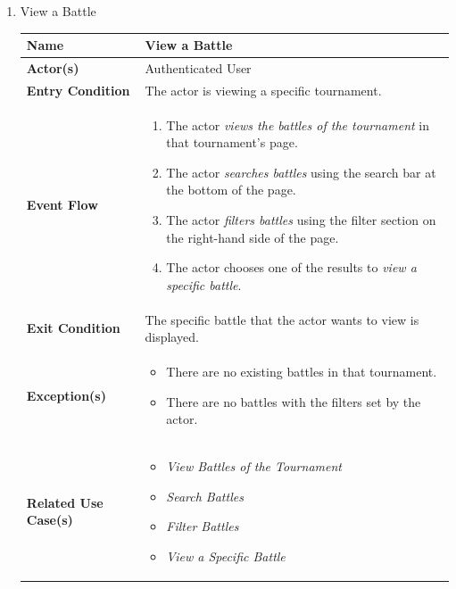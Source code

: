 \begin{enumerate}
\item View a Battle
    \begin{center}
    \begin{tabular}{ | m{10em} | m{10cm}| } 
      \hline
      \textbf{Name} & View a Battle  \\ 
      \hline
      \textbf{Actor(s)} & Authenticated User \\ 
      \hline
      \textbf{Entry Condition} & The actor is viewing a specific tournament. \\ 
      \hline
      \textbf{Event Flow} & 
          \begin{enumerate}[(1)]
              \item The actor \textit{views the battles of the tournament} in that tournament's page.
              \item The actor \textit{searches battles} using the search bar at the bottom of the page.
              \item The actor \textit{filters battles} using the filter section on the right-hand side of the page.
              \item The actor chooses one of the results to \textit{view a specific battle}.
          \end{enumerate}
      \\ 
      \hline
      \textbf{Exit Condition} & The specific battle that the actor wants to view is displayed.  \\ 
      \hline
      \textbf{Exception(s)} & 
      \begin{itemize}
          \item There are no existing battles in that tournament.
          \item There are no battles with the filters set by the actor.
      \end{itemize}
          \\ 
      \hline
      \textbf{Related Use Case(s)} & 
      \begin{itemize}
          \item \textit{View Battles of the Tournament}
          \item \textit{Search Battles}
          \item \textit{Filter Battles}
          \item \textit{View a Specific Battle}
      \end{itemize}
          \\ 
      \hline
    \end{tabular}
\end{center}



\end{enumerate}

